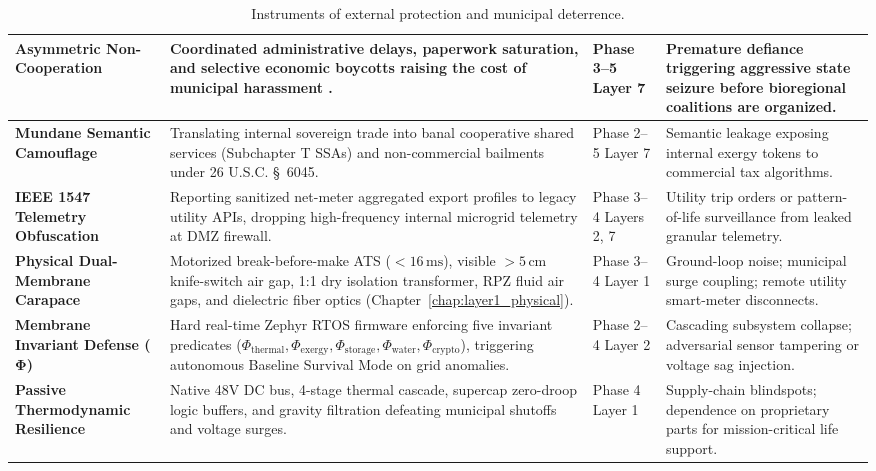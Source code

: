\begin{table}[htbp]
\begin{tabular}{|p{}|p{}|p{}|p{}|}
\hline
\textbf{Asymmetric Non-Cooperation} & Coordinated administrative delays, paperwork saturation, and selective economic boycotts raising the cost of municipal harassment \parencite{sharp1973}. & Phase 3--5 \newline Layer 7 & Premature defiance triggering aggressive state seizure before bioregional coalitions are organized. \\
\hline
\textbf{Mundane Semantic Camouflage} & Translating internal sovereign trade into banal cooperative shared services (Subchapter T SSAs) and non-commercial bailments under 26 U.S.C. \S~6045. & Phase 2--5 \newline Layer 7 & Semantic leakage exposing internal exergy tokens to commercial tax algorithms. \\
\hline
\textbf{IEEE 1547 Telemetry Obfuscation} & Reporting sanitized net-meter aggregated export profiles to legacy utility APIs, dropping high-frequency internal microgrid telemetry at DMZ firewall. & Phase 3--4 \newline Layers 2, 7 & Utility trip orders or pattern-of-life surveillance from leaked granular telemetry. \\
\hline
\textbf{Physical Dual-Membrane Carapace} & Motorized break-before-make ATS ($<16\,\mathrm{ms}$), visible $>5\,\mathrm{cm}$ knife-switch air gap, 1:1 dry isolation transformer, RPZ fluid air gaps, and dielectric fiber optics (Chapter~\ref{chap:layer1_physical}). & Phase 3--4 \newline Layer 1 & Ground-loop noise; municipal surge coupling; remote utility smart-meter disconnects. \\
\hline
\textbf{Membrane Invariant Defense ($\mathbf{\Phi}$)} & Hard real-time Zephyr RTOS firmware enforcing five invariant predicates ($\Phi_{\mathrm{thermal}}, \Phi_{\mathrm{exergy}}, \Phi_{\mathrm{storage}}, \Phi_{\mathrm{water}}, \Phi_{\mathrm{crypto}}$), triggering autonomous Baseline Survival Mode on grid anomalies. & Phase 2--4 \newline Layer 2 & Cascading subsystem collapse; adversarial sensor tampering or voltage sag injection. \\
\hline
\textbf{Passive Thermodynamic Resilience} & Native 48V DC bus, 4-stage thermal cascade, supercap zero-droop logic buffers, and gravity filtration defeating municipal shutoffs and voltage surges. & Phase 4 \newline Layer 1 & Supply-chain blindspots; dependence on proprietary parts for mission-critical life support. \\
\hline
\end{tabular}
\caption{Instruments of external protection and municipal deterrence.}
\label{tab:genesis-instruments-ext}
\end{table}

